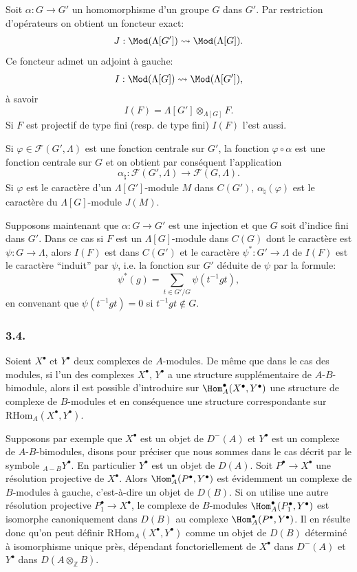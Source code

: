Soit $\alpha:G\to G'$ un homomorphisme d'un groupe $G$ dans $G'$. Par restriction d'opérateurs on obtient un foncteur exact:
\[
J:\Mod(\Lambda[G'])\rightsquigarrow\Mod(\Lambda[G]).
\]
Ce foncteur admet un adjoint à gauche:
\[
I:\Mod(\Lambda[G])\rightsquigarrow\Mod(\Lambda[G']),
\]
à savoir
\[
I(F)=\Lambda[G']\otimes_{\Lambda[G]}F.
\]
Si $F$ est projectif de type fini (resp. de type fini) $I(F)$ l'est aussi.

Si $\varphi\in\mathcal{F}(G',\Lambda)$ est une fonction centrale sur $G'$, la fonction $\varphi\circ\alpha$ est une fonction centrale sur $G$ et on obtient par conséquent l'application
\[
\alpha_\natural: \mathcal{F}(G',\Lambda)\longrightarrow\mathcal{F}(G,\Lambda).
\]
Si $\varphi$ est le caractère d'un $\Lambda[G']$-module $M$ dans $C(G')$, $\alpha_\natural(\varphi)$ est le caractère du $\Lambda[G]$-module $J(M)$.

Supposons maintenant que $\alpha:G\to G'$ est une injection et que $G$ soit d'indice fini dans $G'$. Dans ce cas si $F$ est un $\Lambda[G]$-module dans $C(G)$ dont le caractère est $\psi:G\to\Lambda$, alors $I(F)$ est dans $C(G')$ et le caractère $\psi^*:G'\to\Lambda$ de $I(F)$ est le caractère ``induit'' par $\psi$, i.e. la fonction sur $G'$ déduite de $\psi$ par la formule:
\[
\psi^*(g)=\sum_{t\in G'/G}\psi(t^{-1}gt),
\tag{3.3.1}
\]
en
convenant que $\psi(t^{-1}gt)=0$ si $t^{-1}gt\notin G$.

\subsubsection*{3.4.}

Soient $X^\bullet$ et $Y^\bullet$ deux complexes de $A$-modules. De même que dans le cas des modules, si l'un des complexes $X^\bullet$, $Y^\bullet$ a une structure supplémentaire de $A$-$B$-bimodule, alors il est possible d'introduire sur $\Hom_A^\bullet(X^\bullet,Y^\bullet)$ une structure de complexe de $B$-modules et en conséquence une structure correspondante sur $\mathrm{RHom}_A(X^\bullet,Y^\bullet)$.

Supposons par exemple que $X^\bullet$ est un objet de $D^-(A)$ et $Y^\bullet$ est un complexe de $A$-$B$-bimodules, disons pour préciser que nous sommes dans le cas décrit par le symbole ${}_{A-B}Y^\bullet$. En particulier $Y^\bullet$ est un objet de $D(A)$. Soit $P^\bullet\to X^\bullet$ une résolution projective de $X^\bullet$. Alors $\Hom_A^\bullet(P^\bullet,Y^\bullet)$ est évidemment un complexe de $B$-modules à gauche, c'est-à-dire un objet de $D(B)$. Si on utilise une autre résolution projective $P_1^\bullet\to X^\bullet$, le complexe de $B$-modules $\Hom_A^\bullet(P_1^\bullet,Y^\bullet)$ est isomorphe canoniquement dans $D(B)$ au complexe $\Hom_A^\bullet(P^\bullet,Y^\bullet)$. Il en résulte donc qu'on peut définir $\mathrm{RHom}_A(X^\bullet,Y^\bullet)$ comme un objet de $D(B)$ déterminé à isomorphisme unique près, dépendant fonctoriellement de $X^\bullet$ dans $D^-(A)$ et $Y^\bullet$ dans $D(A\otimes_{\mathbb{Z}}B)$.

